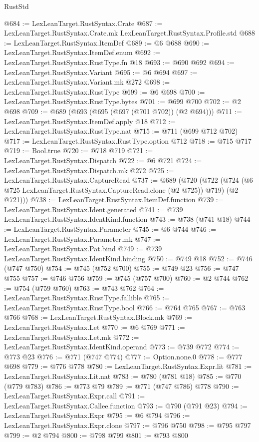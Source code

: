 \begin{lexlean}{RustStd}
\begin{coremodule}
{\begin{coremodule}
{{{{{{{{{{{{{{{@684 := LexLeanTarget.RustSyntax.Crate
@687 := LexLeanTarget.RustSyntax.Crate.mk LexLeanTarget.RustSyntax.Profile.std
@688 := LexLeanTarget.RustSyntax.ItemDef
@689 := @6 @688
@690 := LexLeanTarget.RustSyntax.ItemDef.enum
@692 := LexLeanTarget.RustSyntax.RustType.fn @18
@693 := @690 @692
@694 := LexLeanTarget.RustSyntax.Variant
@695 := @6 @694
@697 := LexLeanTarget.RustSyntax.Variant.mk @272
@698 := LexLeanTarget.RustSyntax.RustType
@699 := @6 @698
@700 := LexLeanTarget.RustSyntax.RustType.bytes
@701 := @699 @700
@702 := @2 @698
@709 := @689 (@693 (@695 (@697 (@701 @702)) (@2 @694)))
@711 := LexLeanTarget.RustSyntax.ItemDef.apply @18
@712 := LexLeanTarget.RustSyntax.RustType.nat
@715 := @711 (@699 @712 @702)
@717 := LexLeanTarget.RustSyntax.RustType.option @712
@718 := @715 @717
@719 := Bool.true
@720 := @718 @719
@721 := LexLeanTarget.RustSyntax.Dispatch
@722 := @6 @721
@724 := LexLeanTarget.RustSyntax.Dispatch.mk @272
@725 := LexLeanTarget.RustSyntax.CaptureRead
@737 := @689
    (@720
      (@722 (@724 (@6 @725 LexLeanTarget.RustSyntax.CaptureRead.clone (@2 @725)) @719) (@2 @721)))
@738 := LexLeanTarget.RustSyntax.ItemDef.function
@739 := LexLeanTarget.RustSyntax.Ident.generated
@741 := @739 LexLeanTarget.RustSyntax.IdentKind.function
@743 := @738 (@741 @18)
@744 := LexLeanTarget.RustSyntax.Parameter
@745 := @6 @744
@746 := LexLeanTarget.RustSyntax.Parameter.mk
@747 := LexLeanTarget.RustSyntax.Pat.bind
@749 := @739 LexLeanTarget.RustSyntax.IdentKind.binding
@750 := @749 @18
@752 := @746 (@747 @750)
@754 := @745 (@752 @700)
@755 := @749 @23
@756 := @747 @755
@757 := @746 @756
@759 := @745 (@757 @700)
@760 := @2 @744
@762 := @754 (@759 @760)
@763 := @743 @762
@764 := LexLeanTarget.RustSyntax.RustType.fallible
@765 := LexLeanTarget.RustSyntax.RustType.bool
@766 := @764 @765
@767 := @763 @766
@768 := LexLeanTarget.RustSyntax.Block.mk
@769 := LexLeanTarget.RustSyntax.Let
@770 := @6 @769
@771 := LexLeanTarget.RustSyntax.Let.mk
@772 := LexLeanTarget.RustSyntax.IdentKind.operand
@773 := @739 @772
@774 := @773 @23
@776 := @771 (@747 @774)
@777 := Option.none.{0}
@778 := @777 @698
@779 := @776 @778
@780 := LexLeanTarget.RustSyntax.Expr.lit
@781 := LexLeanTarget.RustSyntax.Lit.nat
@783 := @780 (@781 @18)
@785 := @770 (@779 @783)
@786 := @773 @79
@789 := @771 (@747 @786) @778
@790 := LexLeanTarget.RustSyntax.Expr.call
@791 := LexLeanTarget.RustSyntax.Callee.function
@793 := @790 (@791 @23)
@794 := LexLeanTarget.RustSyntax.Expr
@795 := @6 @794
@796 := LexLeanTarget.RustSyntax.Expr.clone
@797 := @796 @750
@798 := @795 @797
@799 := @2 @794
@800 := @798 @799
@801 := @793 @800
}}}}}}}}}}}}}}}
\end{coremodule}}
\end{coremodule}
\end{lexlean}
